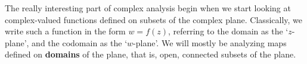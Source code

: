 The really interesting part of complex analysis begin when we start looking at complex-valued functions defined on subsets of the complex plane. Classically, we write such a function in the form $w = f(z)$, referring to the domain as the `$z$-plane', and the codomain as the `$w$-plane'. We will mostly be analyzing maps defined on {\bf domains} of the plane, that is, open, connected subsets of the plane.
%
%
%

